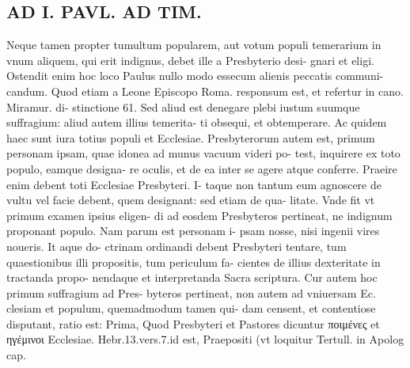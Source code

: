 \documentclass{article}
\begin{document}
\begin{pages}
\section*{AD I. PAVL. AD TIM. }
\marginpar{[ p.552 ]}\pstart Neque tamen propter tumultum popularem, aut votum populi temerarium in vnum aliquem, qui erit indignus, debet ille a Presbyterio desi- gnari et eligi. Ostendit enim hoc loco Paulus nullo modo essecum alienis peccatis communi- candum. Quod etiam a Leone Episcopo Roma. responsum est, et refertur in cano. Miramur. di- stinctione 61. Sed aliud est denegare plebi iustum suumque suffragium: aliud autem illius temerita- ti obsequi, et obtemperare. Ac quidem haec sunt iura totius populi et Ecclesiae. Presbyterorum autem est, primum personam ipsam, quae idonea ad munus vacuum videri po- test, inquirere ex toto populo, eamque designa- re oculis, et de ea inter se agere atque conferre. Praeire enim debent toti Ecclesiae Presbyteri. I- taque non tantum eum agnoscere de vultu vel facie debent, quem designant: sed etiam de qua- litate. Vnde fit vt primum examen ipsius eligen- di ad eosdem Presbyteros pertineat, ne indignum proponant populo. Nam parum est personam i- psam nosse, nisi ingenii vires noueris. It aque do- ctrinam ordinandi debent Presbyteri tentare, tum quaestionibus illi propositis, tum periculum fa- cientes de illius dexteritate in tractanda propo- nendaque et interpretanda Sacra scriptura. Cur autem hoc primum suffragium ad Pres- byteros pertineat, non autem ad vniuersam Ec. clesiam et populum, quemadmodum tamen qui- dam censent, et contentiose disputant, ratio est: Prima, Quod Presbyteri et Pastores dicuntur ποιμένες et ηγέμινοι Ecclesiae. Hebr.13.vers.7.id est, Praepositi (vt loquitur Tertull. in Apolog cap.  \pend

\end{pages}
\end{document}

